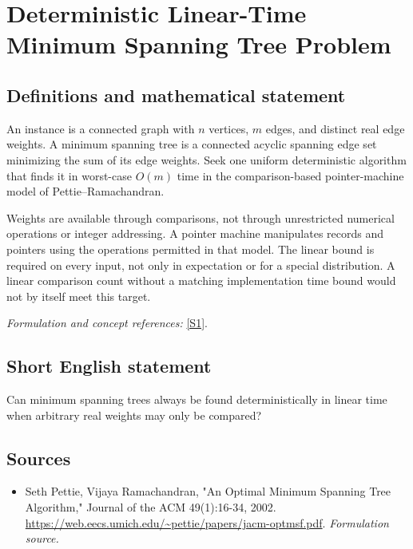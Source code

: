 \documentclass[11pt]{article}
\begin{document}
\section*{\texorpdfstring{Deterministic Linear-Time Minimum Spanning Tree Problem}{Deterministic Linear-Time Minimum Spanning Tree Problem}}\label{437}
\subsection{Definitions and mathematical statement}
An instance is a connected graph with $n$ vertices, $m$ edges, and distinct real edge weights. A minimum spanning tree is a connected acyclic spanning edge set minimizing the sum of its edge weights. Seek one uniform deterministic algorithm that finds it in worst-case $O(m)$ time in the comparison-based pointer-machine model of Pettie--Ramachandran.

Weights are available through comparisons, not through unrestricted numerical operations or integer addressing. A pointer machine manipulates records and pointers using the operations permitted in that model. The linear bound is required on every input, not only in expectation or for a special distribution. A linear comparison count without a matching implementation time bound would not by itself meet this target.
\par\smallskip\textit{Formulation and concept references:} \href{https://web.eecs.umich.edu/~pettie/papers/jacm-optmsf.pdf}{[S1]}.

\subsection{Short English statement}
Can minimum spanning trees always be found deterministically in linear time when arbitrary real weights may only be compared?
\subsection{Sources}
\begin{itemize}
\item[S1]Seth Pettie, Vijaya Ramachandran, "An Optimal Minimum Spanning Tree Algorithm," Journal of the ACM 49(1):16-34, 2002.
\url{https://web.eecs.umich.edu/~pettie/papers/jacm-optmsf.pdf}.
\textit{Formulation source.}
\end{itemize}
\end{document}
